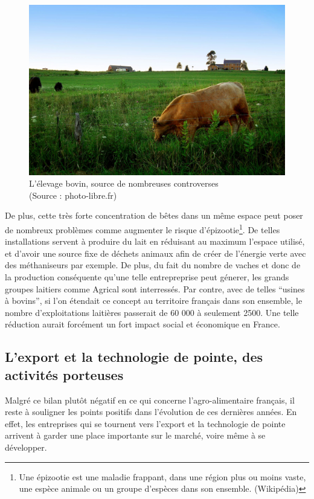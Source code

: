 \documentclass[a4paper,12pt]{report}
\begin{document}
			\begin{figure}[!h]
				\centering
				\includegraphics[scale=1]{Illustrations/Vache.jpg}
				\caption{L'élevage bovin, source de nombreuses controverses\\(Source : photo-libre.fr)}
				\label{Vache}
			\end{figure}
			
			 De plus, cette très forte concentration de bêtes dans un même espace peut poser de nombreux problèmes comme augmenter le risque d'épizootie\footnote{Une épizootie est une maladie frappant, dans une région plus ou moins vaste, une espèce animale ou un groupe d'espèces dans son ensemble. (Wikipédia)}. De telles installations servent à produire du lait en réduisant au maximum l’espace utilisé, et d’avoir une source fixe de déchets animaux afin de créer de l’énergie verte avec des méthaniseurs par exemple. De plus, du fait du nombre de vaches et donc de la production conséquente qu’une telle entrepreprise peut génerer, les grands groupes laitiers comme Agrical sont interressés. Par contre, avec de telles “usines à bovins”, si l’on étendait ce concept au territoire français dans son ensemble, le nombre d’exploitations laitières passerait de 60 000 à seulement 2500. Une telle réduction aurait forcément un fort impact social et économique en France.
			

		\subsection{L'export et la technologie de pointe, des activités porteuses}
			Malgré ce bilan plutôt négatif en ce qui concerne l’agro-alimentaire français, il reste à souligner les points positifs dans l’évolution de ces dernières années. En effet, les entreprises qui se tournent vers l’export et la technologie de pointe arrivent à garder une place importante sur le marché, voire même à se développer.
			
\end{document}
